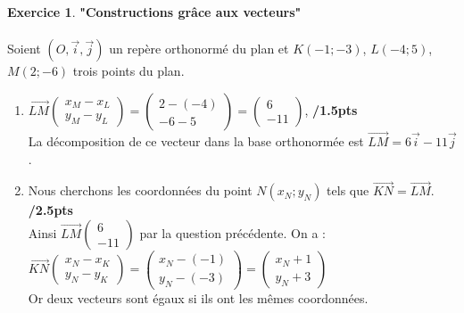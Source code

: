 \documentclass[a4paper,10.9pt]{article}
\theoremstyle{definition}
\newtheorem{exo}{Exercice}
\newcommand{\V}{\overrightarrow}
\begin{document}
\begin{exo} \textbf{"Constructions grâce aux vecteurs"}\\\hfil\\


Soient $(O,\V{i}, \V{j})$ un repère orthonormé du plan et $K(-1;-3)$, $L(-4;5)$,  $M(2;-6)$ trois points du plan.\\ 
\begin{enumerate}
\item $\V{LM}\begin{pmatrix}
	x_M-x_L\\y_M-y_L
\end{pmatrix} = \begin{pmatrix}
2-(-4)\\-6-5
\end{pmatrix} = \begin{pmatrix}
6\\-11
\end{pmatrix}$,\hfill\textbf{ /1.5pts}\\ La décomposition de ce vecteur dans la base orthonormée est  $\V{LM}= 6\V{i}-11\V{j}$.\\[0.5cm]
\item Nous cherchons les coordonnées du point $N(x_N;y_N)$ tels que $\V{KN}=\V{LM}$.\hfill\textbf{ /2.5pts}\\
Ainsi $\V{LM}\begin{pmatrix}
	6\\-11
\end{pmatrix}$ par la question précédente.
On a : $\V{KN} \begin{pmatrix}
	x_N-x_K\\y_N-y_K
\end{pmatrix} = \begin{pmatrix}
x_N-(-1)\\y_N-(-3)
\end{pmatrix}= \begin{pmatrix}
x_N+1\\y_N + 3
\end{pmatrix} $\\[0.2cm]
Or deux vecteurs sont égaux si ils ont les mêmes coordonnées.\\


\end{enumerate}
\end{exo}
\end{document}
